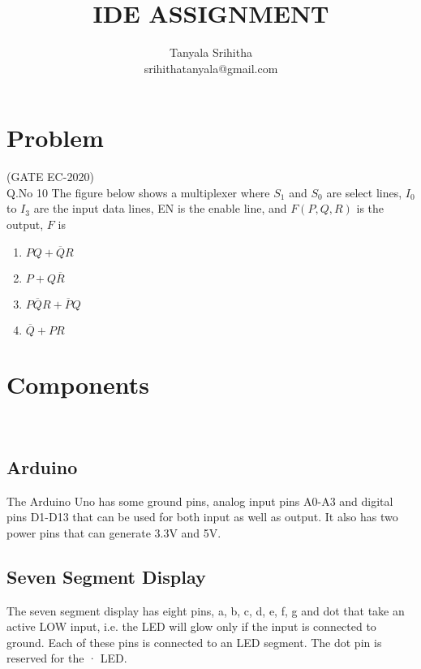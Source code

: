 \documentclass[journal,twocolumn,10pt, a4paper]{article}
\begin{document}
\lstset{ 
  language=C++,
  basicstyle=\ttfamily\footnotesize,
  breaklines=true,
  frame=lines}


\title{IDE ASSIGNMENT}
\author{Tanyala Srihitha\\srihithatanyala@gmail.com}
\maketitle
\tableofcontents 

\section{Problem}                               
(GATE EC-2020)\\                                  
Q.No 10    The figure below shows a multiplexer where $S_1$ and $S_0$ are select lines, $I_0$ to $I_3$ are the input data lines, EN is the enable line, and $F(P,Q,R)$ is the output, $F$ is
\begin{figure}[!h]

\caption{}
\label{fig:Fig 1}
\end{figure}

\begin{enumerate}
   \item $PQ + \overline{Q} R$
   \item $P+Q \overline{R}$
   \item $P \overline{Q} R+\overline{P}Q$
   \item $\overline{Q} +PR$
\end{enumerate}

\section{Components}\\

\begin{table}[!h]
\centering

\caption{}
\label{Tabel1:Components}
\end{table}

\subsection{Arduino}
The Arduino Uno has some ground pins, analog input pins A0-A3 and digital pins D1-D13 that can be used for both input as well as output. It also has two power pins that can generate 3.3V and 5V.
\subsection{Seven Segment Display}
The seven segment display has eight pins, a, b, c, d, e, f, g and dot that take an active LOW input, i.e. the LED will glow only if the input is connected to ground. Each of these pins is connected to an LED segment. The dot pin is reserved for the · LED.
\end{document}
